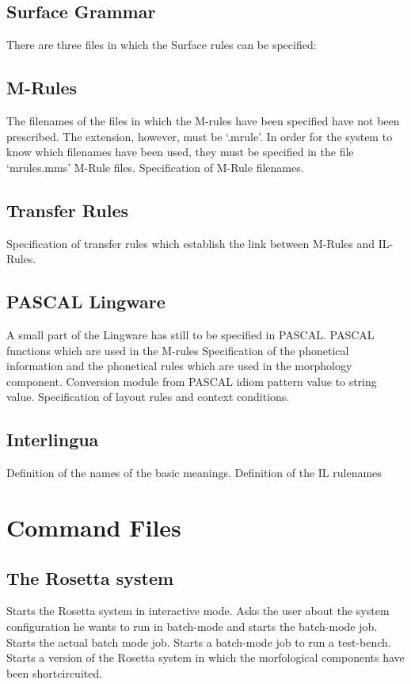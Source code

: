 \subsection{Surface Grammar}
There are three files in which the Surface rules can be specified:
\bsc
{}
\esc
\subsection{M-Rules}
The filenames of the files in which the M-rules have been specified have not
been prescribed. The extension, however, must be `.mrule'. In order for the
system to know which filenames have been used, they must be specified
in the file `mrules.mms'
\bsc
{} M-Rule files.
 Specification of M-Rule filenames.
\esc

\subsection{Transfer Rules}
\bsc
{} Specification of transfer rules
 which establish the link between M-Rules and IL-Rules.
\esc
\subsection{PASCAL Lingware}
A small part of the Lingware has still to be specified in PASCAL.
\bsc
{} PASCAL functions which are used in the M-rules
 Specification of the phonetical information and the
      phonetical rules which are used in the morphology component.
 Conversion module from PASCAL idiom pattern value to
string value.
 Specification of layout rules and context conditions.
\esc
\subsection{Interlingua}
\bsc
{} Definition of the names of the basic
                                    meanings.
 Definition of the IL rulenames
\esc

\newpage
\section{Command Files}
\subsection{The Rosetta system}
\bsc
{} Starts the Rosetta system in interactive mode.
 Asks the user about the system configuration
                            he wants to run in batch-mode and starts the
                            batch-mode job.
 Starts the actual batch mode job.
 Starts a batch-mode job to run a test-bench.
 Starts a version of the Rosetta system in which the
                         morfological components have been shortcircuited.
\esc

